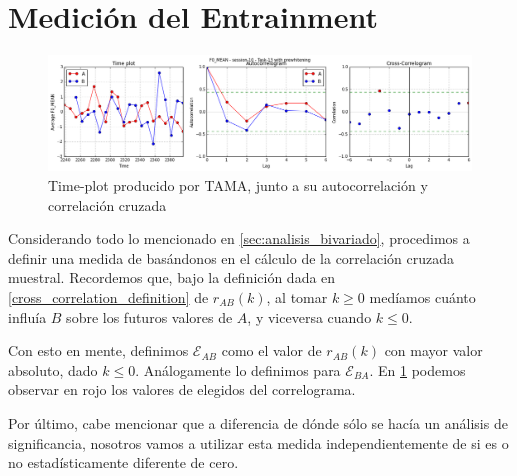 \section{Medición del Entrainment}
\label{sec:method_entrainment}

\newcommand{\fwentrainment}[1] {\mathcal{E}_{#1}}

\begin{figure}
\centering
\includegraphics[width=15cm]{images/time_plot_with_cross_correlation.png}
\caption{Time-plot producido por TAMA, junto a su autocorrelación y correlación cruzada\label{fig:time_plot_with_bivariate}}
\end{figure}

Considerando todo lo mencionado en \ref{sec:analisis_bivariado}, procedimos a definir una medida de \entrainment basándonos en el cálculo de la correlación cruzada muestral. Recordemos que, bajo la definición dada en \ref{cross_correlation_definition} de $r_{AB}(k)$, al tomar $k \geq 0$ medíamos cuánto influía $B$ sobre los futuros valores de $A$, y viceversa cuando $k \leq 0$.

Con esto en mente, definimos $\fwentrainment{AB}$ como el valor de $r_{AB}(k)$ con mayor valor absoluto, dado $k \leq 0$. Análogamente lo definimos para $\fwentrainment{BA}$. En \ref{fig:time_plot_with_bivariate} podemos observar en rojo los valores de \entrainment elegidos del correlograma.

Por último, cabe mencionar que a diferencia de \cite{KOU2008.2} dónde sólo se hacía un análisis de significancia, nosotros vamos a utilizar esta medida independientemente de si es o no estadísticamente diferente de cero.
